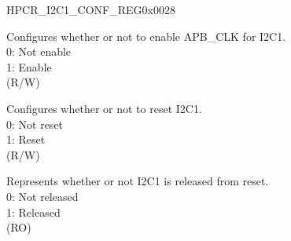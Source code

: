 \begin{register}{H}{PCR\_I2C1\_CONF\_REG}{0x0028}\label{regdesc:PCRI2C1CONFREG}
%
%
%
%
\regnewline%
\begin{regdesc}\begin{reglist}
\label{fielddesc:PCRI2C1CLKEN}\item [PCR\_I2C1\_CLK\_EN] Configures whether or not to enable APB\_CLK for I2C1.\\
0: Not enable\\
1: Enable\\
(R/W)
\label{fielddesc:PCRI2C1RSTEN}\item [PCR\_I2C1\_RST\_EN] Configures whether or not to reset I2C1.\\
0: Not reset\\
1: Reset\\(R/W)
\label{fielddesc:PCRI2C1READY}\item [PCR\_I2C1\_READY] Represents whether or not I2C1 is released from reset.\\
0: Not released\\
1: Released\\ (RO)
\end{reglist}\end{regdesc}
\end{register}


